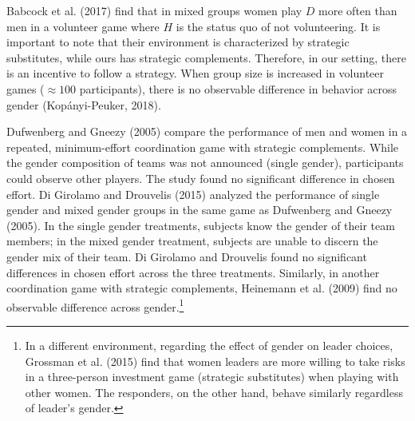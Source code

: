 \documentclass[12pt,english]{article}
\begin{document}
Babcock et al. (2017) find that in mixed groups women play $D$  more often than men in a volunteer game where $H$ is the status quo of not volunteering. It is important to note that their environment is characterized by strategic substitutes, while ours has strategic complements. Therefore, in our setting, there is an incentive to follow a strategy. When group size is increased in volunteer games ($\approx 100$ participants), there is no observable difference in behavior across gender (Kop\'{a}nyi-Peuker, 2018).   

Dufwenberg and Gneezy (2005) compare the performance of men and women in a repeated, minimum-effort coordination game with strategic complements. While the gender composition of teams was not announced (single gender), participants could observe other players. The study found no significant difference in chosen effort. Di Girolamo and Drouvelis (2015) analyzed the performance of single gender and mixed gender groups in the same game as Dufwenberg and Gneezy (2005). In the single gender treatments, subjects know the gender of their team members; in the mixed gender treatment, subjects are unable to discern the gender mix of their team. Di Girolamo and Drouvelis found no significant differences in chosen effort across the three treatments. Similarly, in another coordination game with strategic complements,  Heinemann et al. (2009) find no observable difference across gender.\footnote{In a different environment, regarding the effect of gender on leader choices, Grossman et al. (2015) find that women leaders are more willing to take risks in a three-person investment game (strategic substitutes) when playing with other women. The responders, on the other hand, behave similarly regardless of leader's gender.} 
 

\end{document}
